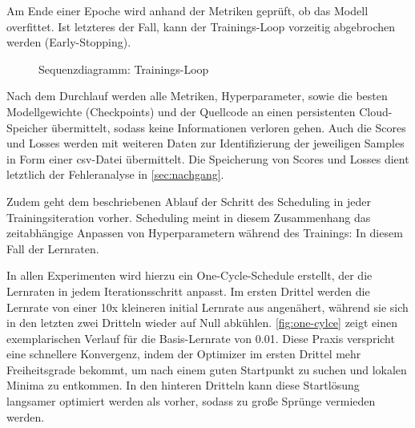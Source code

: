 Am Ende einer Epoche wird anhand der Metriken geprüft, ob das Modell overfittet.
Ist letzteres der Fall, kann der Trainings-Loop vorzeitig abgebrochen werden (Early-Stopping).

\begin{figure}[htbp!]
    \centering
    \caption{Sequenzdiagramm: Trainings-Loop}
    \label{fig:train-loop}
\end{figure}

Nach dem Durchlauf werden alle Metriken, Hyperparameter, sowie die besten Modellgewichte (Checkpoints) und der Quellcode an einen persistenten Cloud-Speicher übermittelt, sodass keine Informationen verloren gehen.
Auch die Scores und Losses werden mit weiteren Daten zur Identifizierung der jeweiligen Samples in Form einer \gls{csv}-Datei übermittelt.
Die Speicherung von Scores und Losses dient letztlich der Fehleranalyse in \autoref{sec:nachgang}.

Zudem geht dem beschriebenen Ablauf der Schritt des Scheduling in jeder Trainingsiteration vorher.
Scheduling meint in diesem Zusammenhang das zeitabhängige Anpassen von Hyperparametern während des Trainings: In diesem Fall der Lernraten.

In allen Experimenten wird hierzu ein One-Cycle-Schedule \cite{Smith15} erstellt, der die Lernraten in jedem Iterationsschritt anpasst.
Im ersten Drittel werden die Lernrate von einer 10x kleineren initial Lernrate aus angenähert, während sie sich in den letzten zwei Dritteln wieder auf Null abkühlen.
\autoref{fig:one-cylce} zeigt einen exemplarischen Verlauf für die Basis-Lernrate von 0.01.
Diese Praxis verspricht eine schnellere Konvergenz, indem der Optimizer im ersten Drittel mehr Freiheitsgrade bekommt, um nach einem guten Startpunkt zu suchen und lokalen Minima zu entkommen.
In den hinteren Dritteln kann diese Startlösung langsamer optimiert werden als vorher, sodass zu große Sprünge vermieden werden.

